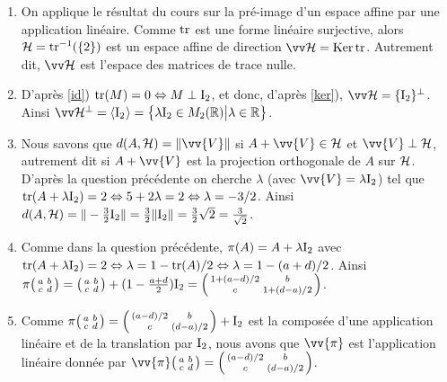 \documentclass[a4paper,12pt,reqno]{amsart}
\begin{document}
\begin{solution}
  \begin{enumerate}[resume]
    \item\label{ker} On applique le résultat du cours sur la pré-image d'un espace affine par une application linéaire. Comme $\operatorname{tr}$ est une forme linéaire surjective, alors $\mathcal{H}=\operatorname{tr}^{-1}(\{2\})$ est un espace affine de direction $\ev{H}=\ker\tr$. Autrement dit, $\ev{H}$ est l'espace des matrices de trace nulle.
    \item D'après \ref{id}) $\operatorname{tr}(M)=0 \Leftrightarrow M \perp \mathrm{I}_{2}$, et donc, d'après \ref{ker}), $\ev{H} = \{\I2\}^{\perp}$.\\ Ainsi $\ev{H}^{\perp} = \affspan{\I2}=\big\{ \lambda\I2 \in M_2(\mathbb{R})\big| \lambda \in \mathbb{R} \big\}$.
    \item Nous savons que $d(A,\ens{H})=\norm{\vv{V}}$ si $A + \vv{V} \in \ens{H}$ et $\vv{V} \perp \ens{H}$, autrement dit si $A + \vv{V}$ est la projection orthogonale de $A$ sur $\mathcal{H}$. D'après la question précédente on cherche $\lambda$ (avec $\vv{V}=\lambda\I2$) tel que $\operatorname{tr}(A+\lambda\mathrm{I}_{2})=2 \Leftrightarrow 5+2\lambda=2 \Leftrightarrow \lambda=-3/2$. Ainsi $d(A,\mathcal{H})=\|-\frac32\mathrm{I}_{2}\|=\frac32\|\mathrm{I}_{2}\|=\frac32 \sqrt{2} = \frac{3}{\sqrt{2}}$.
    \item Comme dans la question précédente, $\pi(A) = A+\lambda\mathrm{I}_{2}$ avec $\operatorname{tr}(A+\lambda\mathrm{I}_{2})=2 \Leftrightarrow \lambda=1-\operatorname{tr}(A)/2 \Leftrightarrow \lambda=1-(a+d)/2$. Ainsi $\pi\begin{psmallmatrix} a & b\\ c & d\end{psmallmatrix} = \begin{psmallmatrix} a & b\\ c & d\end{psmallmatrix} + (1-\frac{a+d}{2})\mathrm{I}_{2} = \begin{psmallmatrix} 1+(a-d)/2 & b\\ c & 1+(d-a)/2\end{psmallmatrix}$.
    \item Comme $\pi\begin{psmallmatrix} a & b\\ c & d\end{psmallmatrix} = \begin{psmallmatrix} (a-d)/2 & b\\ c & (d-a)/2\end{psmallmatrix}+\mathrm{I}_{2}$ est la composée d'une application linéaire et de la translation par $\mathrm{I}_{2}$, nous avons que $\vv{\pi}$ est l'application linéaire donnée par $\vv{\pi}\begin{psmallmatrix} a & b\\ c & d\end{psmallmatrix} = \begin{psmallmatrix} (a-d)/2 & b\\ c & (d-a)/2\end{psmallmatrix}$.
  \end{enumerate}
\end{solution}
\end{document}
